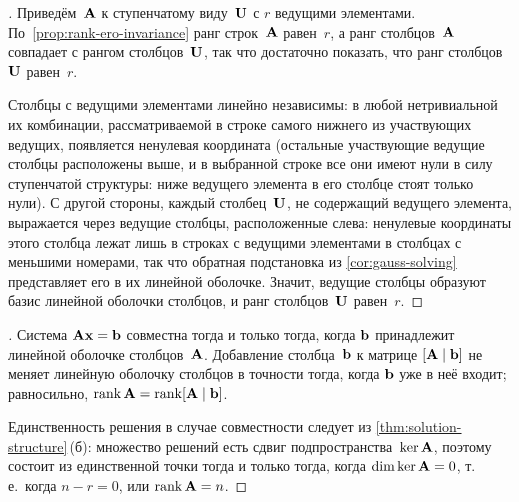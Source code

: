 \begin{proof}[]
Приведём~$\mathbf{A}$ к ступенчатому виду~$\mathbf{U}$ с $r$ ведущими
элементами. По~\cref{prop:rank-ero-invariance} ранг строк~$\mathbf{A}$
равен~$r$, а ранг столбцов~$\mathbf{A}$ совпадает с рангом
столбцов~$\mathbf{U}$, так что достаточно показать, что ранг
столбцов~$\mathbf{U}$ равен~$r$.

Столбцы с ведущими элементами линейно независимы: в любой
нетривиальной их комбинации, рассматриваемой в строке самого нижнего
из участвующих ведущих, появляется ненулевая координата (остальные
участвующие ведущие столбцы расположены выше, и в выбранной строке
все они имеют нули в силу ступенчатой структуры: ниже ведущего элемента
в его столбце стоят только нули).
С другой стороны, каждый столбец~$\mathbf{U}$, не содержащий ведущего
элемента, выражается через ведущие столбцы, расположенные слева:
ненулевые координаты этого столбца лежат лишь в строках с ведущими
элементами в столбцах с меньшими номерами, так что обратная
подстановка из \cref{cor:gauss-solving} представляет его в их линейной
оболочке. Значит, ведущие столбцы образуют базис линейной оболочки
столбцов, и ранг столбцов~$\mathbf{U}$ равен~$r$.
\end{proof}

\begin{proof}[]
Система $\mathbf{A}\mathbf{x} = \mathbf{b}$ совместна тогда и только тогда,
когда $\mathbf{b}$ принадлежит линейной оболочке столбцов~$\mathbf{A}$.
Добавление столбца~$\mathbf{b}$ к матрице $[\mathbf{A} \mid \mathbf{b}]$ не
меняет линейную оболочку столбцов в точности тогда, когда $\mathbf{b}$
уже в неё входит; равносильно,
$\operatorname{rank} \mathbf{A} = \operatorname{rank} [\mathbf{A} \mid \mathbf{b}]$.

Единственность решения в случае совместности следует из
\cref{thm:solution-structure}\,(б): множество решений есть сдвиг
подпространства~$\ker \mathbf{A}$, поэтому состоит из единственной точки
тогда и только тогда, когда $\dim \ker \mathbf{A} = 0$, т.\,е.\ когда
$n - r = 0$, или $\operatorname{rank} \mathbf{A} = n$.
\end{proof}

